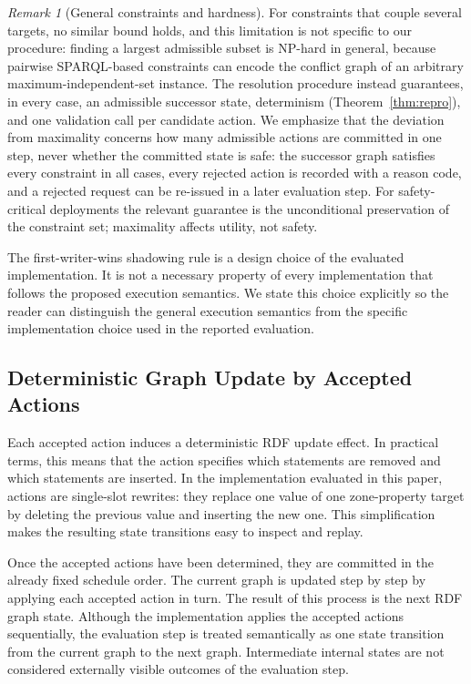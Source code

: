 \documentclass{ieeeaccess}
\theoremstyle{definition}
\theoremstyle{plain}
\theoremstyle{remark}
\newtheorem{remark}{Remark}
\begin{document}
\begin{remark}[General constraints and hardness]
\label{rem:hardness}
For constraints that couple several targets, no similar bound holds, and this limitation is not specific to our procedure: finding a largest admissible subset is NP-hard in general, because pairwise SPARQL-based constraints can encode the conflict graph of an arbitrary maximum-independent-set instance. The resolution procedure instead guarantees, in every case, an admissible successor state, determinism (Theorem~\ref{thm:repro}), and one validation call per candidate action. We emphasize that the deviation from maximality concerns how many admissible actions are committed in one step, never whether the committed state is safe: the successor graph satisfies every constraint in all cases, every rejected action is recorded with a reason code, and a rejected request can be re-issued in a later evaluation step. For safety-critical deployments the relevant guarantee is the unconditional preservation of the constraint set; maximality affects utility, not safety.
\end{remark}

The first-writer-wins shadowing rule is a design choice of the evaluated implementation. It is not a necessary property of every implementation that follows the proposed execution semantics. We state this choice explicitly so the reader can distinguish the general execution semantics from the specific implementation choice used in the reported evaluation.

\subsection{Deterministic Graph Update by Accepted Actions}

Each accepted action induces a deterministic RDF update effect. In practical terms, this means that the action specifies which statements are removed and which statements are inserted. In the implementation evaluated in this paper, actions are single-slot rewrites: they replace one value of one zone-property target by deleting the previous value and inserting the new one. This simplification makes the resulting state transitions easy to inspect and replay.

Once the accepted actions have been determined, they are committed in the already fixed schedule order. The current graph is updated step by step by applying each accepted action in turn. The result of this process is the next RDF graph state. Although the implementation applies the accepted actions sequentially, the evaluation step is treated semantically as one state transition from the current graph to the next graph. Intermediate internal states are not considered externally visible outcomes of the evaluation step.
\end{document}
